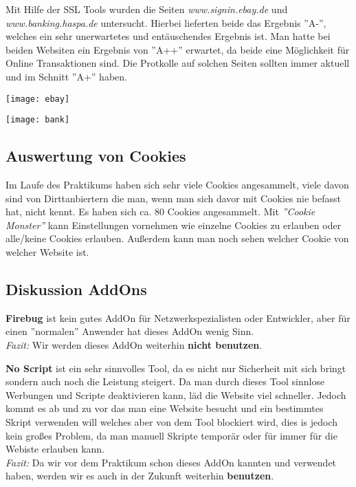 \documentclass{scrartcl}
\begin{document}
  Mit Hilfe der SSL Tools wurden die Seiten \emph{\textit{www.signin.ebay.de}} und \emph{\textit{www.banking.haspa.de}} untersucht. Hierbei lieferten beide das Ergebnis ''A-'', welches ein sehr unerwartetes und entäuschendes Ergebnis ist.
  Man hatte bei beiden Websiten ein Ergebnis von ''A++'' erwartet, da beide eine Möglichkeit für Online Transaktionen sind. Die Protkolle auf solchen Seiten sollten immer aktuell und im Schnitt ''A+'' haben.
  
  \texttt{[image: ebay]}
  \label{fig : ebay}
  
  \texttt{[image: bank]}
  \label{fig:bank}
  
  \subsection[Aufgabe 10 Auswertung von Cookies]{Auswertung von Cookies}
  
  Im Laufe des Praktikums haben sich sehr viele Cookies angesammelt, viele davon sind von Dirttanbiertern die man, wenn man sich davor mit Cookies nie befasst hat, nicht kennt. Es haben sich ca. 80 Cookies angesammelt. 
  Mit \textit{''Cookie Monster''} kann Einstellungen vornehmen wie einzelne Cookies zu erlauben oder alle/keine Cookies erlauben. Außerdem kann man noch sehen welcher Cookie von welcher Website ist.
  
  \subsection[Aufgabe 11 Diskussion AddOns]{Diskussion AddOns}
  
  \textbf{Firebug} ist kein gutes AddOn für Netzwerkspezialisten oder Entwickler, aber für einen ''normalen'' Anwender hat dieses AddOn wenig Sinn.\\ 
  \emph{Fazit:} Wir werden dieses AddOn weiterhin \textbf{nicht benutzen}.
  
  \textbf{No Script} ist ein sehr sinnvolles Tool, da es nicht nur Sicherheit mit sich bringt sondern auch noch die Leistung steigert. Da man durch dieses Tool sinnlose Werbungen und Scripte deaktivieren kann, läd die Website viel schneller. Jedoch kommt es ab und zu vor das man eine Website besucht und ein bestimmtes Skript verwenden will welches aber von dem Tool blockiert wird, dies is jedoch kein großes Problem, da man manuell Skripte temporär oder für immer für die Webiste erlauben kann. \\
  \emph{Fazit:} Da wir vor dem Praktikum schon dieses AddOn kannten und verwendet haben, werden wir es auch in der Zukunft weiterhin \textbf{benutzen}.
  
\end{document}
